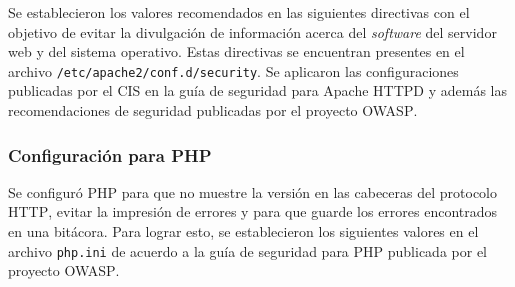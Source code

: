 Se establecieron los valores recomendados en las siguientes directivas con el objetivo de evitar la divulgaci\'{o}n de informaci\'{o}n acerca del \emph{\gls{software}} del servidor web y del sistema operativo. Estas directivas se encuentran presentes en el archivo \texttt{/etc/apache2/conf.d/security}. Se aplicaron las configuraciones publicadas por el \textsc{\gls{CIS}} en la gu\'{i}a de seguridad para Apache \textsc{HTTPD}\cite{_microsoft_????-1} y adem\'{a}s las recomendaciones de seguridad publicadas por el proyecto \textsc{\gls{OWASP}}\cite{_scg_????}.

{
 \begin{table}[H]
 \caption{Directivas de seguridad de Apache \textsc{HTTPD}}{}
 \label{tab:apache-hardening}
 \noindent{} %
 \end{table}
}

        \subsubsection{Configuraci\'{o}n para \textsc{PHP}}

Se configur\'{o} \gls{PHP} para que no muestre la versi\'{o}n en las cabeceras del protocolo \textsc{\gls{HTTP}}, evitar la impresi\'{o}n de errores y para que guarde los errores encontrados en una bit\'{a}cora. Para lograr esto, se establecieron los siguientes valores en el archivo \texttt{php.ini} de acuerdo a la gu\'{i}a de seguridad para \gls{PHP} publicada por el proyecto \textsc{\gls{OWASP}}\cite{_php_????}.

{
 \begin{table}[H]
 \caption{Directivas de seguridad de \textsc{PHP}}{}
 \noindent{} %
 \end{table}
}


